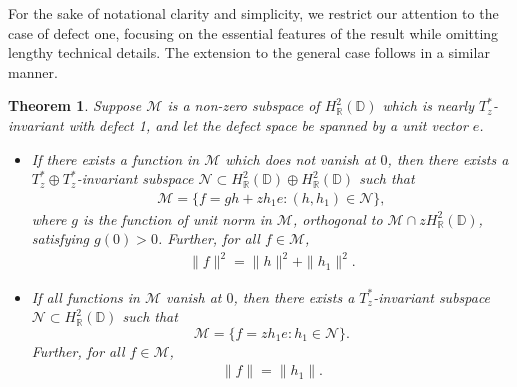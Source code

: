 \documentclass[11pt]{amsart}
\newtheorem{theorem}{Theorem}[section]
\numberwithin{equation}{section}
\begin{document}
\textnormal{For the sake of notational clarity and simplicity, we restrict our attention to the case of defect one, focusing on the essential features of the result while omitting lengthy technical details. The extension to the general case follows in a similar manner.}

\begin{theorem}\label{MT2}
Suppose $\mathcal{M}$ is a non-zero subspace of $H^2_{\mathbb{R}}(\mathbb{D})$ which is nearly $T^*_z$-invariant with defect 1, and let the defect space be spanned by a unit vector $e$. 
\begin{itemize}
    \item[(i)] If there exists a function in $\mathcal{M}$ which does not vanish at $0$, then there exists a $T^*_z\oplus T^*_z$-invariant subspace $\mathcal{N}\subset H^2_{\mathbb{R}}(\mathbb{D}) \oplus H^2_\mathbb{R}(\mathbb{D})$ such that
\begin{eqnarray*}
    \mathcal{M}=\Big\{f=gh + zh_1e : (h, h_1)\in \mathcal{N}\Big\},
\end{eqnarray*}
where $g$ is the function of unit norm in $\mathcal{M}$, orthogonal to $\mathcal{M}\cap zH^2_{\mathbb{R}}(\mathbb{D})$, satisfying $g(0)>0$. Further, for all $f\in \mathcal{M}$,
\begin{eqnarray*}
\|f\|^2=\|h\|^2 + \|h_1\|^2.
\end{eqnarray*}
\item[(ii)] If all functions in $\mathcal{M}$ vanish at $0$, then there exists a $T^*_z$-invariant subspace $\mathcal{N}\subset H^2_{\mathbb{R}}(\mathbb{D})$ such that
$$\mathcal{M}=\Big\{f=zh_1e : h_1\in \mathcal{N}\Big\}.$$
 Further, for all $f \in \mathcal{M}$,
\begin{eqnarray*}
    \|f\|=\|h_1\|.
\end{eqnarray*}
\end{itemize}
\end{theorem}
\end{document}
